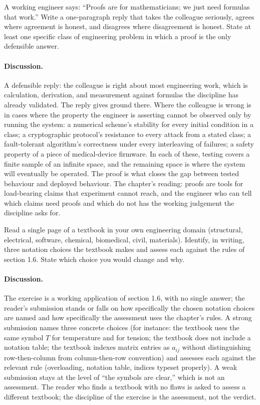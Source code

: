 \begin{exercise}
A working engineer says: ``Proofs are for mathematicians; we just
need formulas that work.'' Write a one-paragraph reply that takes
the colleague seriously, agrees where agreement is honest, and
disagrees where disagreement is honest. State at least one specific
class of engineering problem in which a proof is the only defensible
answer.

\paragraph{Discussion.}
A defensible reply: the colleague is right about most engineering
work, which is calculation, derivation, and measurement against
formulas the discipline has already validated. The reply gives
ground there. Where the colleague is wrong is in cases where the
property the engineer is asserting cannot be observed only by
running the system: a numerical scheme's stability for every initial
condition in a class; a cryptographic protocol's resistance to every
attack from a stated class; a fault-tolerant algorithm's
correctness under every interleaving of failures; a safety
property of a piece of medical-device firmware. In each of these,
testing covers a finite sample of an infinite space, and the
remaining space is where the system will eventually be operated.
The proof is what closes the gap between tested behaviour and
deployed behaviour. The chapter's reading: proofs are tools for
load-bearing claims that experiment cannot reach, and the engineer
who can tell which claims need proofs and which do not has the
working judgement the discipline asks for.
\end{exercise}

\begin{exercise}
Read a single page of a textbook in your own engineering domain
(structural, electrical, software, chemical, biomedical, civil,
materials). Identify, in writing, three notation choices the
textbook makes and assess each against the rules of section 1.6.
State which choice you would change and why.

\paragraph{Discussion.}
The exercise is a working application of section 1.6, with no
single answer; the reader's submission stands or falls on how
specifically the chosen notation choices are named and how
specifically the assessment uses the chapter's rules. A strong
submission names three concrete choices (for instance: the textbook
uses the same symbol $T$ for temperature and for tension; the
textbook does not include a notation table; the textbook indexes
matrix entries as $a_{ij}$ without distinguishing row-then-column
from column-then-row convention) and assesses each against the
relevant rule (overloading, notation table, indices typeset
properly). A weak submission stays at the level of ``the symbols
are clear,'' which is not an assessment. The reader who finds a
textbook with no flaws is asked to assess a different textbook;
the discipline of the exercise is the assessment, not the verdict.
\end{exercise}

